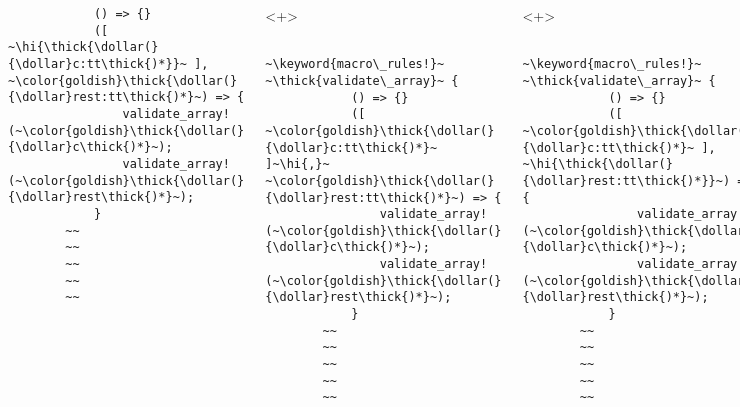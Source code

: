 \documentclass[usepdftitle=false]{beamer}
\newcommand{\dollar}{\makebox[\widthof{\$}][c]{\$}}
\newcommand{\thick}[1]{\contourlength{0.16pt}\contour[10]{black}{#1}}
\newcommand{\hi}[1]{%
\tikz[baseline=(A.base)]
 \node[highlighting=yellowbg,inner sep=0pt,text depth=0pt] (A) {#1};%
}
\newcommand{\keyword}[1]{\color{greenish}#1}
\begin{document}
\begin{frame}[fragile]
\begin{columns}
\begin{onlyenv}
\begin{verbatim}
            () => {}
            ([ ~\hi{\thick{\dollar(}{\dollar}c:tt\thick{)*}}~ ], ~\color{goldish}\thick{\dollar(}{\dollar}rest:tt\thick{)*}~) => {
                validate_array!(~\color{goldish}\thick{\dollar(}{\dollar}c\thick{)*}~);
                validate_array!(~\color{goldish}\thick{\dollar(}{\dollar}rest\thick{)*}~);
            }
        ~~
        ~~
        ~~
        ~~
        ~~
      \end{verbatim}
    \end{onlyenv}
    \begin{onlyenv}<+>
      \begin{verbatim}
        ~\keyword{macro\_rules!}~ ~\thick{validate\_array}~ {
            () => {}
            ([ ~\color{goldish}\thick{\dollar(}{\dollar}c:tt\thick{)*}~ ]~\hi{,}~ ~\color{goldish}\thick{\dollar(}{\dollar}rest:tt\thick{)*}~) => {
                validate_array!(~\color{goldish}\thick{\dollar(}{\dollar}c\thick{)*}~);
                validate_array!(~\color{goldish}\thick{\dollar(}{\dollar}rest\thick{)*}~);
            }
        ~~
        ~~
        ~~
        ~~
        ~~
      \end{verbatim}
    \end{onlyenv}
    \begin{onlyenv}<+>
      \begin{verbatim}
        ~\keyword{macro\_rules!}~ ~\thick{validate\_array}~ {
            () => {}
            ([ ~\color{goldish}\thick{\dollar(}{\dollar}c:tt\thick{)*}~ ], ~\hi{\thick{\dollar(}{\dollar}rest:tt\thick{)*}}~) => {
                validate_array!(~\color{goldish}\thick{\dollar(}{\dollar}c\thick{)*}~);
                validate_array!(~\color{goldish}\thick{\dollar(}{\dollar}rest\thick{)*}~);
            }
        ~~
        ~~
        ~~
        ~~
        ~~
      \end{verbatim}
    \end{onlyenv}
    \begin{onlyenv}<+>
      \begin{verbatim}
        ~\keyword{macro\_rules!}~ ~\thick{validate\_array}~ {
            () => {}
            ([ ~\hi{\thick{\dollar(}{\dollar}c:tt\thick{)*}}~ ], ~\color{goldish}\thick{\dollar(}{\dollar}rest:tt\thick{)*}~) => {
                validate_array!(~\hi{\thick{\dollar(}{\dollar}c\thick{)*}}~);
                validate_array!(~\color{goldish}\thick{\dollar(}{\dollar}rest\thick{)*}~);
            }
        ~~
        ~~
        ~~
        ~~
        ~~
      \end{verbatim}
    \end{onlyenv}

\end{columns}
\end{frame}
\end{document}
